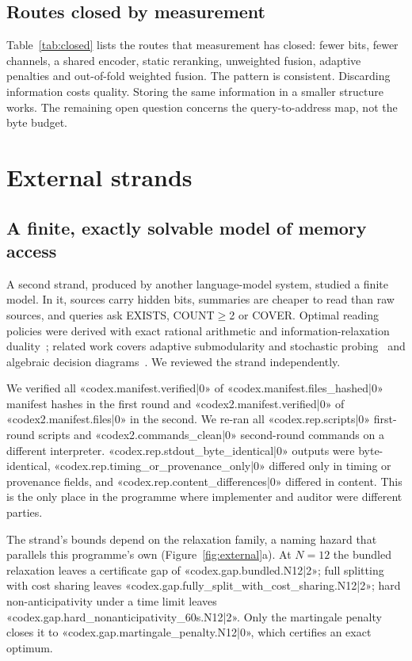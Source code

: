 \documentclass[11pt,a4paper]{article}
\begin{document}


\subsection{Routes closed by measurement}
Table~\ref{tab:closed} lists the routes that measurement has closed: fewer bits, fewer channels, a shared encoder, static reranking, unweighted fusion, adaptive penalties and out-of-fold weighted fusion. The pattern is consistent. Discarding information costs quality. Storing the same information in a smaller structure works. The remaining open question concerns the query-to-address map, not the byte budget.



\section{External strands}\label{sec:external}
\subsection{A finite, exactly solvable model of memory access}\label{sec:codex}
A second strand, produced by another language-model system, studied a finite model. In it, sources carry hidden bits, summaries are cheaper to read than raw sources, and queries ask EXISTS, COUNT$\ge$2 or COVER. Optimal reading policies were derived with exact rational arithmetic and information-relaxation duality~\citep{brown2010information}; related work covers adaptive submodularity and stochastic probing~\citep{golovin2010adaptive,deshpande2013sbfe} and algebraic decision diagrams~\citep{hoey2013spudd}. We reviewed the strand independently.

We verified all «codex.manifest.verified|0» of «codex.manifest.files_hashed|0» manifest hashes in the first round and «codex2.manifest.verified|0» of «codex2.manifest.files|0» in the second. We re-ran all «codex.rep.scripts|0» first-round scripts and «codex2.commands_clean|0» second-round commands on a different interpreter. «codex.rep.stdout_byte_identical|0» outputs were byte-identical, «codex.rep.timing_or_provenance_only|0» differed only in timing or provenance fields, and «codex.rep.content_differences|0» differed in content. This is the only place in the programme where implementer and auditor were different parties.

The strand's bounds depend on the relaxation family, a naming hazard that parallels this programme's own (Figure~\ref{fig:external}a). At $N=12$ the bundled relaxation leaves a certificate gap of «codex.gap.bundled.N12|2»; full splitting with cost sharing leaves «codex.gap.fully_split_with_cost_sharing.N12|2»; hard non-anticipativity under a time limit leaves «codex.gap.hard_nonanticipativity_60s.N12|2». Only the martingale penalty closes it to «codex.gap.martingale_penalty.N12|0», which certifies an exact optimum.
\end{document}
